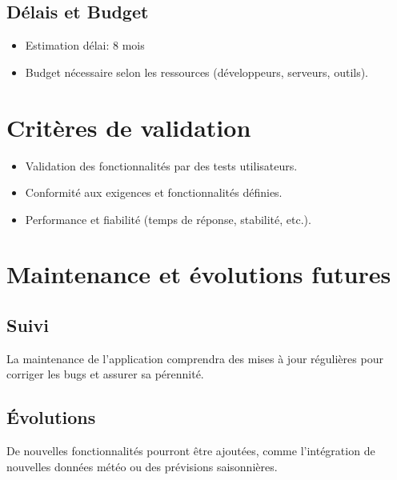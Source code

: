\documentclass[a4paper,12pt]{article}
\begin{document}
\subsection{Délais et Budget}
\begin{itemize}
    \item Estimation délai: 8 mois 
    \item Budget nécessaire selon les ressources (développeurs, serveurs, outils).
\end{itemize}

\section{Critères de validation}
\begin{itemize}
    \item Validation des fonctionnalités par des tests utilisateurs.
    \item Conformité aux exigences et fonctionnalités définies.
    \item Performance et fiabilité (temps de réponse, stabilité, etc.).
\end{itemize}

\section{Maintenance et évolutions futures}
\subsection{Suivi}
La maintenance de l'application comprendra des mises à jour régulières pour corriger les bugs et assurer sa pérennité.

\subsection{Évolutions}
De nouvelles fonctionnalités pourront être ajoutées, comme l'intégration de nouvelles données météo ou des prévisions saisonnières.
\end{document}
